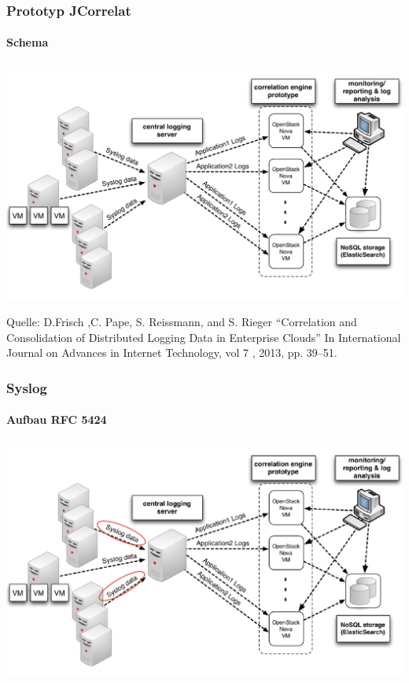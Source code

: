 \begin{frame}
\frametitle{Prototyp JCorrelat}
\framesubtitle{Schema}


 \includegraphics[scale=0.25]{img/schema_correlat-00.png}
\vspace{0.5cm}

\footnoterule
\footnotesize{
    Quelle:
    D.Frisch ,C. Pape, S. Reissmann, and S. Rieger “Correlation and
    Consolidation of Distributed Logging Data in Enterprise Clouds” In International
    Journal on Advances in Internet Technology, vol 7 , 2013, pp. 39–51.}

\end{frame}

\begin{frame}
\frametitle{Syslog}
\framesubtitle{Aufbau RFC 5424}
\includegraphics[scale=0.25]{img/schema-correlat-01.png}
\end{frame}


